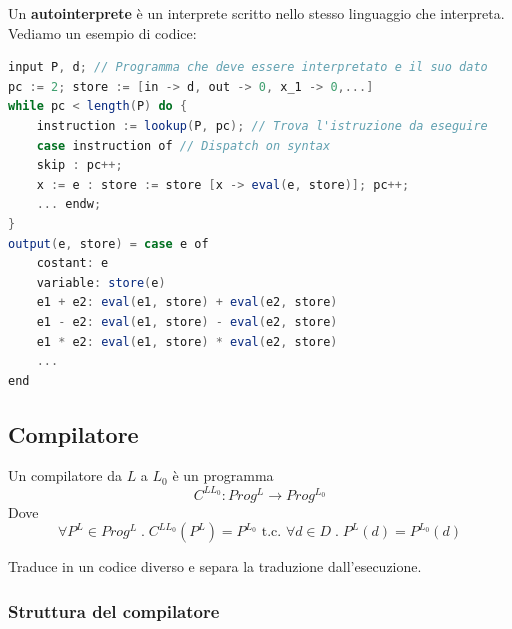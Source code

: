 \documentclass[a4paper]{article}
\begin{document}
\begin{Example}{}{}
    Un \textbf{autointerprete} è un interprete scritto 
    nello stesso linguaggio che interpreta. Vediamo un esempio di codice:
\begin{lstlisting}[language=scala]
input P, d; // Programma che deve essere interpretato e il suo dato 
pc := 2; store := [in -> d, out -> 0, x_1 -> 0,...]
while pc < length(P) do {
    instruction := lookup(P, pc); // Trova l'istruzione da eseguire
    case instruction of // Dispatch on syntax 
    skip : pc++;
    x := e : store := store [x -> eval(e, store)]; pc++;
    ... endw; 
}
output(e, store) = case e of 
    costant: e 
    variable: store(e)
    e1 + e2: eval(e1, store) + eval(e2, store)
    e1 - e2: eval(e1, store) - eval(e2, store)
    e1 * e2: eval(e1, store) * eval(e2, store)
    ...
end
\end{lstlisting}  
\end{Example}

\subsection{Compilatore}

{
Un compilatore da $L$ a $L_0$ è un
programma \[C^{LL_0}: Prog^L \to Prog^{L_0}\]
Dove 
\[
    \forall P^L \in Prog^L \; . \; C^{LL_0}(P^L) = P^{L_0} 
    \text{ t.c. } \forall d \in D \; .\; P^L(d) = P^{L_0}(d)
\]
}

\begin{figure}[H]
    \centering 
\end{figure}
\noindent
Traduce in un codice diverso e separa la traduzione dall'esecuzione. 
\subsubsection{Struttura del compilatore}
\end{document}
